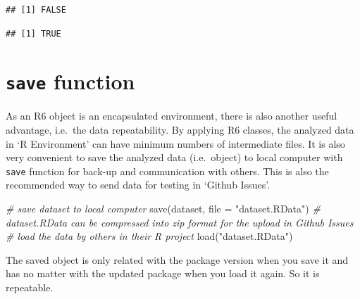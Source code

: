 \documentclass[
]{book}
\newenvironment{Shaded}{\begin{snugshade}}{\end{snugshade}}
\newcommand{\AttributeTok}[1]{\textcolor[rgb]{0.77,0.63,0.00}{#1}}
\newcommand{\CommentTok}[1]{\textcolor[rgb]{0.56,0.35,0.01}{\textit{#1}}}
\newcommand{\ConstantTok}[1]{\textcolor[rgb]{0.00,0.00,0.00}{#1}}
\newcommand{\FunctionTok}[1]{\textcolor[rgb]{0.00,0.00,0.00}{#1}}
\newcommand{\NormalTok}[1]{#1}
\newcommand{\OtherTok}[1]{\textcolor[rgb]{0.56,0.35,0.01}{#1}}
\newcommand{\SpecialCharTok}[1]{\textcolor[rgb]{0.00,0.00,0.00}{#1}}
\newcommand{\StringTok}[1]{\textcolor[rgb]{0.31,0.60,0.02}{#1}}
\begin{document}
\begin{verbatim}
## [1] FALSE
\end{verbatim}

\begin{Shaded}
\end{Shaded}

\begin{verbatim}
## [1] TRUE
\end{verbatim}

\hypertarget{save-function}{%
\section{\texorpdfstring{\texttt{save} function}{save function}}\label{save-function}}

As an R6 object is an encapsulated environment, there is also another useful advantage, i.e.~the data repeatability.
By applying R6 classes, the analyzed data in `R Environment' can have minimum numbers of intermediate files.
It is also very convenient to save the analyzed data (i.e.~object) to local computer with \texttt{save} function for back-up and communication with others.
This is also the recommended way to send data for testing in `Github Issues'.

\begin{Shaded}
\begin{Highlighting}[]
\CommentTok{\# save \textquotesingle{}dataset\textquotesingle{} to local computer}
\FunctionTok{save}\NormalTok{(dataset, }\AttributeTok{file =} \StringTok{"dataset.RData"}\NormalTok{)}
\CommentTok{\# dataset.RData can be compressed into zip format for the upload in \textquotesingle{}Github Issues\textquotesingle{}}
\CommentTok{\# load the data by others in their R project}
\FunctionTok{load}\NormalTok{(}\StringTok{"dataset.RData"}\NormalTok{)}
\end{Highlighting}
\end{Shaded}

The saved object is only related with the package version when you save it and has no matter with the updated package when you load it again.
So it is repeatable.
\end{document}
